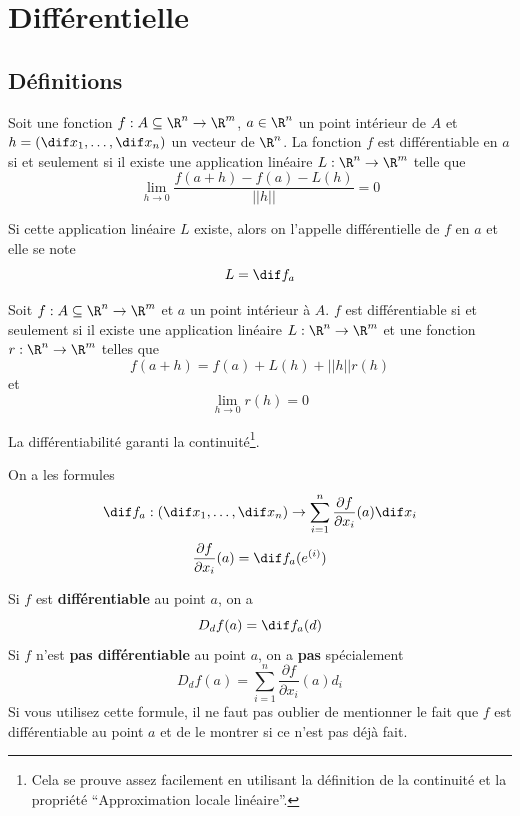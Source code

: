 \section{Différentielle}

\subsection{Définitions}

\begin{mydef}[Différentielle]
	Soit une fonction $f : A \subseteq \R^n \to \R^m$, $a \in \R^n$ un point intérieur de $A$ et $h = (\dif x_1, \dots, \dif x_n)$ un vecteur de $\R^n$. La fonction $f$ est différentiable en $a$ si et seulement si il existe une application linéaire $L : \R^n \to \R^m$ telle que
	\[ \lim_{h \to 0} \frac{f(a+h) - f(a) - L(h)}{||h||} = 0 \]

	Si cette application linéaire $L$ existe, alors on l'appelle différentielle de $f$ en $a$ et elle se note
	\[ L = \dif f_a \]
\end{mydef}

\begin{myprop}
	Soit $f : A \subseteq \R^n \to \R^m$ et $a$ un point intérieur à $A$. $f$ est différentiable si et seulement si il existe une application linéaire $L : \R^n \to \R^m$ et une fonction $r : \R^n \to \R^m$ telles que
	\[ f(a+h) = f(a) + L(h) + ||h|| r(h) \]
	et
	\[ \lim_{h \to 0}r(h) = 0 \]
\end{myprop}

\begin{myprop}[Continuité]
	La différentiabilité garanti la continuité\footnote{Cela se prouve assez facilement
	en utilisant la définition de la continuité et la propriété ``Approximation locale linéaire''.}.
\end{myprop}

\begin{myform} On a les formules
	\[ \dif f_a : (\dif x_1 , \dots , \dif x_n) \to \sum_{i=1}^n \frac{\pa f}{\pa x_i}(a) \dif x_i \]
	\[ \frac{\pa f}{\pa x_i}(a) = \dif f_a(e^{(i)}) \]
\end{myform}

\begin{myform}
	Si $f$ est \textbf{différentiable} au point $a$, on a
	\[ D_df(a) = \dif f_a(d) \]
	Si $f$ n'est \textbf{pas différentiable} au point $a$, on a \textbf{pas} spécialement
	\[ D_df(a) = \sum_{i = 1}^n \frac{\partial f}{\partial x_i}(a)d_i \]
	Si vous utilisez cette formule, il ne faut pas oublier de mentionner le fait que $f$ est différentiable au point $a$
	et de le montrer si ce n'est pas déjà fait.
\end{myform}

